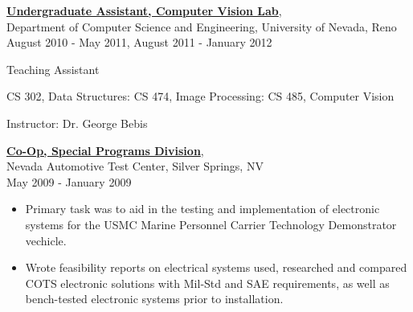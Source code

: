 \documentclass[10pt]{article}
\newenvironment{outerlist}[1][\enskip\textbullet]%
        {\begin{itemize}[#1]}{\end{itemize}%
         \vspace{-.6\baselineskip}}
\newenvironment{innerlist}[1][\enskip\textbullet]%
        {\begin{compactitem}[#1]}{\end{compactitem}}
\begin{document}
\href{http://www.cse.unr.edu/CVL/}
     {\textbf{Undergraduate Assistant, Computer Vision Lab}},\\
     Department of Computer Science and Engineering, University of Nevada, Reno\\
     August 2010 - May 2011, August 2011 - January 2012
     \begin{outerlist}
     \item Teaching Assistant
        \begin{innerlist}
        \item CS 302, Data Structures: CS 474, Image Processing: CS 485, Computer Vision
        \item Instructor: Dr. George Bebis\\
        \end{innerlist}
     \end{outerlist}
\href{http://www.natc-ht.com}
     {\textbf{Co-Op, Special Programs Division}},\\
     Nevada Automotive Test Center, Silver Springs, NV \\
     May 2009 - January 2009
     \begin{outerlist}
     \item Primary task was to aid in the testing and implementation of electronic systems for
           the USMC Marine Personnel Carrier Technology Demonstrator vechicle.
     \item Wrote feasibility reports on electrical systems used, researched and compared
           COTS electronic solutions with Mil-Std and SAE requirements, 
           as well as bench-tested electronic systems prior to installation.
     \end{outerlist}

\end{document}
